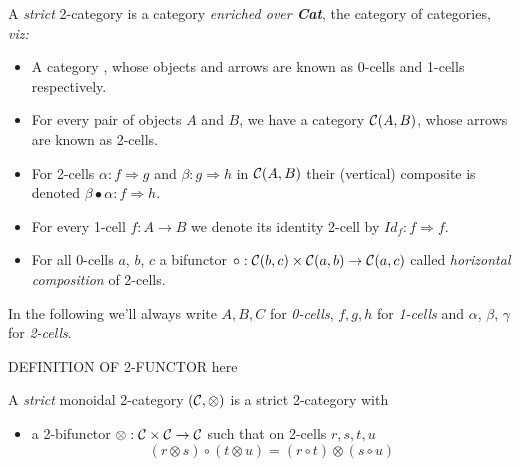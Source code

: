 \documentclass[a4paper]{article}
\begin{document}
\begin{definition}  \label{def:strict-two-cat}
A \emph{strict} 2-category \catC is a category \emph{enriched over
  \textbf{Cat}}, the category of categories, \emph{viz:}
\begin{itemize}
\item A category \catC, whose objects and arrows are known as
  0-cells and 1-cells respectively.
\item For every pair of objects $A$ and $B$, we have a
  category ${\cal C}(A, B)$, whose arrows are known as 2-cells.
\item For 2-cells $\alpha : f \Rightarrow g$ and $\beta : g
  \Rightarrow h$ in ${\cal C}(A,B)$ their (vertical) composite is denoted
  $\beta\bullet\alpha : f \Rightarrow h$.
\item For every 1-cell $f:A\to B$ we denote its identity 2-cell by
  $Id_f:f \Rightarrow f$.
\item For all 0-cells $a$, $b$, $c$ a bifunctor $\circ: {\cal C}(b, c)
  \times {\cal C}(a, b) \to {\cal C}(a, c)$ called \emph{horizontal
    composition} of 2-cells.
\end{itemize}
\end{definition}

\noindent
In the following we'll always write $A, B, C$ for \emph{0-cells}, $f,
g, h$ for \emph{1-cells} and $\alpha$, $\beta$, $\gamma$ for
\emph{2-cells}.

\begin{definition}
  \label{def:two-functor}
  DEFINITION OF 2-FUNCTOR here
\end{definition}


\begin{definition}\label{def:monoidal-two-cat}
A \emph{strict} monoidal 2-category $({\cal C}, \otimes)$ is a strict
2-category with
\begin{itemize}
\item a 2-bifunctor $\otimes: {\cal C} \times {\cal C} \to {\cal C}$ such that
  on 2-cells $r, s, t, u$
\[
(r \otimes s) \circ (t \otimes u) = (r \circ t) \otimes (s \circ u)
\]
\end{itemize}
\end{definition}
\end{document}

